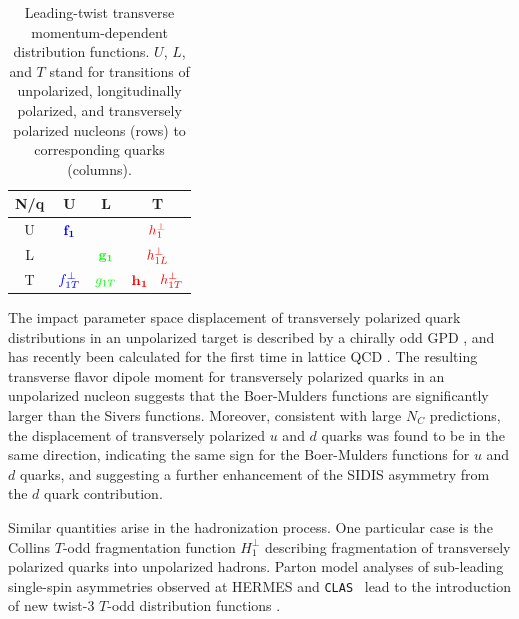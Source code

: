\begin{table}
\begin{center}
\begin{tabular}{|c|c|c|c|} \hline\hline
N/q & U & L & T \\ \hline
 {U} & ${\color{blue} \bf f_1}$   & & ${\color{red} h_{1}^\perp}$ \\
\hline
 {L} & &${\color{green} \bf g_1}$ &    ${\color{red} h_{1L}^\perp}$ \\
\hline
 {T} & ${\color{blue} f_{1T}^\perp} $ &  ${\color{green} g_{1T}}$ &  ${\color{red} \bf h_1}$ \, ${\color{red} h_{1T}^\perp }$ \\
\hline\hline
\end{tabular}
\end{center}
\caption{\small{{Leading-twist transverse momentum-dependent distribution 
functions.  $U$, $L$, and $T$ stand for transitions of unpolarized, 
longitudinally polarized, and transversely polarized nucleons (rows) to 
corresponding quarks (columns).}}
\label{tab1}} 
\end{table}

The impact parameter space displacement of transversely polarized quark 
distributions in an unpolarized target is described by a chirally odd GPD 
\cite{Burkardt:2005hp}, and has recently been calculated for the first time 
in lattice QCD \cite{Gockeler:2005cd,Gockeler:2006zu}. The resulting transverse
flavor dipole moment for transversely polarized quarks in an unpolarized 
nucleon suggests that the Boer-Mulders functions are significantly larger 
than the Sivers functions.  Moreover, consistent with large $N_C$ predictions, 
the displacement of transversely polarized $u$ and $d$ quarks was found to be 
in the same direction, indicating the same sign for the Boer-Mulders functions
for $u$ and $d$ quarks, and suggesting a further enhancement of the
SIDIS asymmetry from the $d$ quark contribution.

Similar quantities arise in the hadronization process.  One particular case 
is the Collins $T$-odd fragmentation function $H_1^{\perp}$ 
\cite{Collins:1992kk} describing fragmentation of transversely polarized 
quarks into unpolarized hadrons.  Parton model analyses 
\cite{Efremov:2002ut,Afanasev:2003ze,Yuan:2003gu,Metz:2004je} of sub-leading 
single-spin asymmetries observed at HERMES 
\cite{Airapetian:1999tv,Airapetian:2006rx} and {\tt CLAS}~\cite{Avakian:2003pk}
lead to the introduction of new twist-3 $T$-odd distribution functions 
\cite{Collins:2004nx,Boer:2003cm}. 

